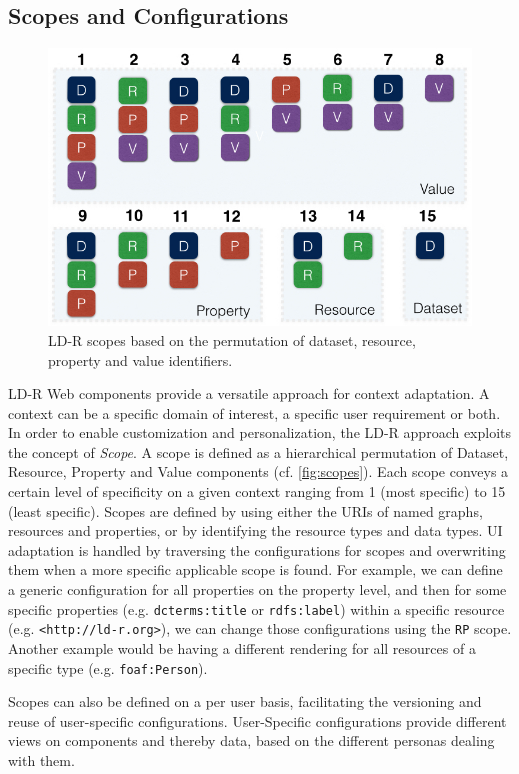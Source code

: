 \documentclass{acm_proc_article-sp}
\begin{document}
\subsection{Scopes and Configurations}

\begin{figure}[tb]
  \includegraphics[width=.9\linewidth]{images/scopes.jpg}
  \caption{LD-R scopes based on the permutation of dataset, resource, property and value identifiers.}
  \label{fig:scopes}
\end{figure}

LD-R Web components provide a versatile approach for context adaptation.
A context can be a specific domain of interest, a specific user requirement or both.
In order to enable customization and personalization, the LD-R approach exploits the concept of \emph{Scope}.
A scope is defined as a hierarchical permutation of Dataset, Resource, Property and Value components (cf. \autoref{fig:scopes}).
Each scope conveys a certain level of specificity on a given context ranging from 1 (most specific) to 15 (least specific).
Scopes are defined by using either the URIs of named graphs, resources and properties, or by identifying the resource types and data types.
UI adaptation is handled by traversing the configurations for scopes and overwriting them when a more specific applicable scope is found.
For example, we can define a generic configuration for all properties on the property level, and then for some specific properties (e.g. \texttt{dcterms:title} or \texttt{rdfs:label}) within a specific resource (e.g. \texttt{<http://ld-r.org>}), we can change those configurations using the \texttt{RP} scope.
Another example would be having a different rendering for all resources of a specific type (e.g. \texttt{foaf:Person}).

Scopes can also be defined on a per user basis, facilitating the versioning and reuse of user-specific configurations.
User-Specific configurations provide different views on components and thereby data, based on the different personas dealing with them.
\end{document}

